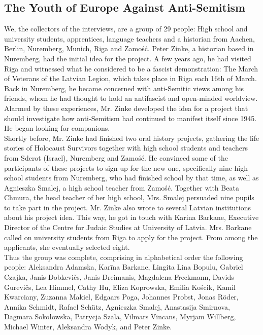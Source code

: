 \subsection*{The Youth of Europe Against Anti-Semitism} 
We, the collectors of the interviews, are a group of 29 people: High school and university students, apprentices, language teachers and a historian from Aachen, Berlin, Nuremberg, Munich, Riga and Zamość. Peter Zinke, a historian based in Nuremberg, had the initial idea for the project. A few years ago, he had visited Riga and witnessed what he considered to be a fascist demonstration: The March of Veterans of the Latvian Legion, which takes place in Riga each 16th of March. \\
Back in Nuremberg, he became concerned with anti-Semitic views among his friends, whom he had thought to hold an antifascist and open-minded worldview. Alarmed by these experiences, Mr. Zinke developed the idea for a project that should investigate how anti-Semitism had continued to manifest itself since 1945. He began looking for companions. \\
Shortly before, Mr. Zinke had finished two oral history projects, gathering the life stories of Holocaust Survivors together with high school students and teachers from Sderot (Israel), Nuremberg and Zamość. He convinced some of the participants of these projects to sign up for the new one, specifically nine high school students from Nuremberg, who had finished school by that time, as well as Agnieszka Smalej, a high school teacher from Zamość. Together with Beata Chmura, the head teacher of her high school, Mrs. Smalej persuaded nine pupils to take part in the project. Mr. Zinke also wrote to several Latvian institutions about his project idea. This way, he got in touch with Karina Barkane, Executive Director of the Centre for Judaic Studies at University of Latvia. Mrs. Barkane called on university students from Riga to apply for the project. From among the applicants, she eventually selected eight.\\
Thus the group was complete, comprising in alphabetical order the following people: Aleksandra Adamska, Karīna Barkane, Lingita Lina Bopulu, Gabriel Czajka, Janis Dobkevičs, Janis Dreimanis, Magdalena Freckmann, Davids Gurevičs, Lea Himmel, Cathy Hu, Eliza Koprowska, Emilia Kościk, Kamil Kwarciany, Zuzanna Makiel, Edgaars Poga, Johannes Probst, Jonas Röder, Annika Schmidt, Rafael Schütz, Agnieszka Smalej, Anastasija Smirnova, Dagmara Sokołowska, Patrycja Szala, Vilmars Vincans, Myrjam Willberg, Michael Winter, Aleksandra Wodyk, and Peter Zinke. \\
